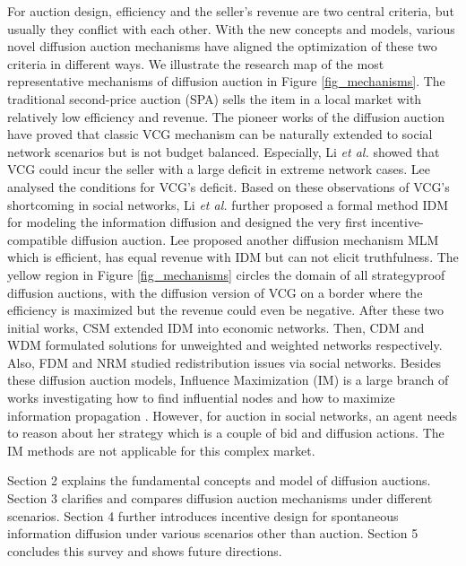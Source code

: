 \documentclass{article}
\begin{document}
For auction design, efficiency and the seller's revenue are two central criteria, but usually they conflict with each other. With the new concepts and models, various novel diffusion auction mechanisms have aligned the optimization of these two criteria in different ways. We illustrate the research map of the most representative mechanisms of diffusion auction in Figure \ref{fig_mechanisms}. The traditional second-price auction (SPA) sells the item in a local market with relatively low efficiency and revenue. The pioneer works of the diffusion auction \cite{li2017mechanism,lee2017mechanisms} have proved that classic VCG mechanism \cite{vickrey1961counterspeculation,clarke1971multipart,groves1973incentives} can be naturally extended to social network scenarios but is not budget balanced. Especially, Li \emph{et al.}  showed that VCG could incur the seller with a large deficit in extreme network cases. Lee  analysed the conditions for VCG's deficit. Based on these observations of VCG's shortcoming in social networks, Li \emph{et al.}  further proposed a formal method IDM for modeling the information diffusion and designed the very first incentive-compatible diffusion auction. Lee  proposed another diffusion mechanism MLM which is efficient, has equal revenue with IDM but can not elicit truthfulness. The yellow region in Figure \ref{fig_mechanisms} circles the domain of all strategyproof diffusion auctions, with the diffusion version of VCG on a border where the efficiency is maximized but the revenue could even be negative. After these two initial works, CSM \cite{li2018customer} extended IDM into economic networks. Then, CDM and WDM \cite{li2019diffusion} formulated solutions for unweighted and weighted networks respectively. Also, FDM \cite{zhang2020redistribution} and NRM \cite{zhangECAIincentivize} studied redistribution issues via social networks. Besides these diffusion auction models, Influence Maximization (IM) is a large branch of works investigating how to find influential nodes and how to maximize information propagation \cite{kempe2003maximizing,chen2009efficient,banerjee2019maximizing}. However, for auction in social networks, an agent needs to reason about her strategy which is a couple of bid and diffusion actions. The IM methods are not applicable for this complex market.

Section 2 explains the fundamental concepts and model of diffusion auctions. Section 3 clarifies and compares diffusion auction mechanisms under different scenarios. Section 4 further introduces incentive design for spontaneous information diffusion under various scenarios other than auction. Section 5 concludes this survey and shows future directions. 
\end{document}
